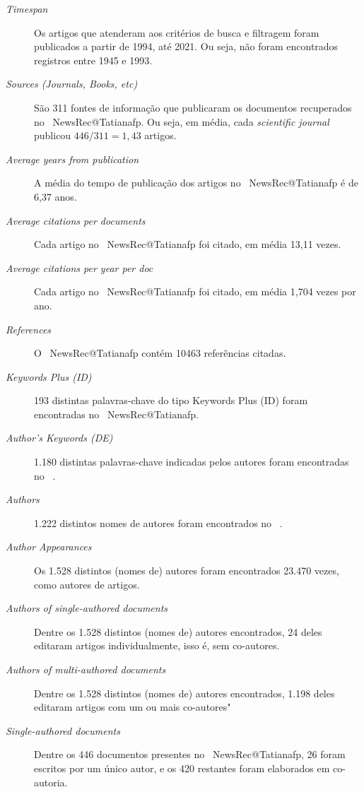 \begin{description}
    \item [\textit{Timespan}]  Os artigos que atenderam aos critérios de busca e filtragem foram publicados a partir de 1994, até 2021. Ou seja, não foram encontrados registros entre 1945 e 1993.
    \item [\textit{Sources (Journals, Books, etc)}] São 311 fontes de informação que publicaram os documentos recuperados no \dataset\  NewsRec@Tatianafp. Ou seja, em média, cada \textit{scientific journal} publicou $446/311=1,43$ artigos. 
    \item [\textit{Average years from publication}] A média do tempo de publicação dos artigos no \dataset\  NewsRec@Tatianafp é de 6,37 anos.
    \item [\textit{Average citations per documents}] Cada artigo no \dataset\   NewsRec@Tatianafp  foi citado, em média 13,11 vezes.
    \item [\textit{Average citations per year per doc}] Cada artigo no \dataset\   NewsRec@Tatianafp  foi citado, em média 1,704 vezes por ano.
    \item [\textit{References}] O \dataset\  NewsRec@Tatianafp contém 10463 referências citadas.
    \item [\textit{Keywords Plus (ID)}] 193 distintas palavras-chave do tipo Keywords Plus (ID) foram encontradas no \dataset\ NewsRec@Tatianafp. 
    \item [\textit{Author's Keywords (DE)}] 1.180 distintas palavras-chave indicadas pelos autores foram encontradas no \dataset\ .
    \item [\textit{Authors}] 1.222 distintos nomes de autores foram encontrados no \dataset\ .
    \item [\textit{Author Appearances}] Os 1.528 distintos (nomes de) autores foram encontrados 23.470 vezes, como autores de artigos.
    \item [\textit{Authors of single-authored documents}] Dentre os 1.528 distintos (nomes de) autores encontrados, 24 deles editaram artigos individualmente, isso é, sem co-autores.
    \item [\textit{Authors of multi-authored documents}] Dentre os 1.528 distintos (nomes de) autores encontrados, 1.198 deles editaram artigos com um ou mais co-autores"
    \item [\textit{Single-authored documents}] Dentre os 446 documentos presentes no \dataset\   NewsRec@Tatianafp, 26 foram escritos por um único autor, e os 420 restantes foram elaborados em co-autoria.

\end{description}
